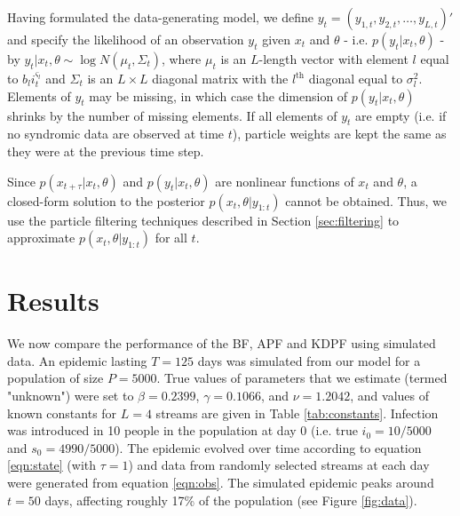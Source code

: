 \documentclass{elsarticle}
\begin{document}
Having formulated the data-generating model, we define $y_t = (y_{1,t},y_{2,t},\ldots,y_{L,t})'$ and specify the likelihood of an observation $y_t$ given $x_t$ and $\theta$ - i.e. $p(y_t|x_t,\theta)$ - by $y_t|x_t,\theta \sim \log N(\mu_t,\Sigma_t)$, where $\mu_t$ is an $L$-length vector with element $l$ equal to $b_li_t^{\varsigma_l}$ and $\Sigma_t$ is an $L \times L$ diagonal matrix with the $l^{\mbox{th}}$ diagonal equal to $\sigma_l^2$. Elements of $y_t$ may be missing, in which case the dimension of $p(y_t|x_t,\theta)$ shrinks by the number of missing elements. %
If all elements of $y_t$ are empty (i.e. if no syndromic data are observed at time $t$), particle weights are kept the same as they were at the previous time step.


Since $p(x_{t+\tau}|x_t,\theta)$ and $p(y_t|x_t,\theta)$ are nonlinear functions of $x_t$ and $\theta$, a closed-form solution to the posterior $p(x_t,\theta|y_{1:t})$ cannot be obtained. Thus, we use the particle filtering techniques described in Section \ref{sec:filtering} to approximate $p(x_t,\theta|y_{1:t})$ for all $t$.

\section{Results} \label{sec:results}

We now compare the performance of the BF, APF and KDPF using simulated data.  An epidemic lasting $T = 125$ days was simulated from our model for a population of size $P = 5000$. True values of parameters that we estimate (termed "unknown") were set to $\beta = 0.2399$, $\gamma = 0.1066$, and $\nu = 1.2042$, and values of known constants for $L = 4$ streams are given in Table \ref{tab:constants}. Infection was introduced in 10 people in the population at day 0 (i.e. true $i_0 = 10/5000$ and $s_0 = 4990/5000$). The epidemic evolved over time according to equation \eqref{eqn:state} (with $\tau = 1$) and data from randomly selected streams at each day were generated from equation \eqref{eqn:obs}. The simulated epidemic peaks around $t = 50$ days, affecting roughly 17\% of the population (see Figure \ref{fig:data}).
\end{document}
